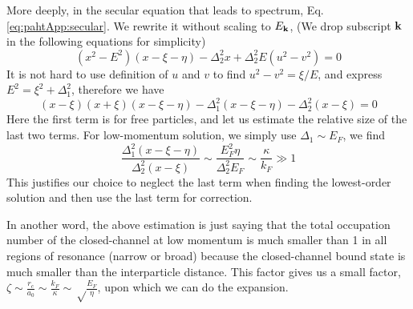 More deeply, in the secular equation that leads to spectrum, Eq. \ref{eq:pahtApp:secular}.  We rewrite it without scaling to $E_{\mathbf{k}}$,  (We drop subscript $\mathbf{k}$ in the following equations for simplicity)
\begin{equation*}
(x^{2}-E^{2})(x-\xi-\eta)-\Delta_{2}^{2}x+\Delta_{2}^{2}E(u^{2}-v^{2})=0
\end{equation*}
It is not hard to use definition of $u$ and $v$ to find $u^{2}-v^{2}=\xi/E$, and express $E^{2}=\xi^{2}+\Delta_{1}^{2}$, therefore we have
\begin{equation*}
(x-\xi)(x+\xi)(x-\xi-\eta)-\Delta_{1}^{2}(x-\xi-\eta)-\Delta_{2}^{2}(x-\xi)=0
\end{equation*}
Here the first term is for free particles, and let us estimate the relative size of the last two terms.  For low-momentum solution, we simply use $\Delta_{1}\sim{}E_{F}$, we find
\begin{equation*}
\frac{\Delta_{1}^{2}(x-\xi-\eta)}{\Delta_{2}^{2}(x-\xi)}\sim\frac{E_{F}^{2}\eta}{\Delta_{2}^{2}E_{F}}\sim\frac{\kappa}{k_{F}}\gg1
\end{equation*}
This justifies our choice to neglect the last term when finding the lowest-order solution and then use the last term for correction.  

 



 In another word, the above estimation is just saying that the total occupation number of the closed-channel at low momentum is much smaller than 1 in all regions of resonance (narrow or broad) because the closed-channel bound state is much smaller than the interparticle distance.  This factor gives us a small factor, $\zeta\sim\frac{r_{c}}{a_{0}}\sim\frac{k_{F}}{\kappa}\sim\sqrt\frac{E_{F}}{\eta}$, upon which we can do the expansion.  
